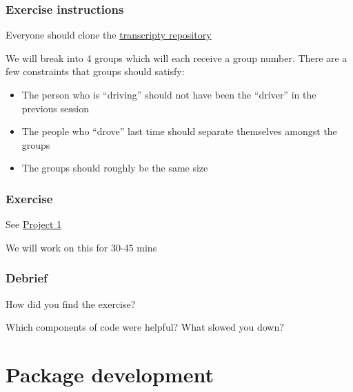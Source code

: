 \documentclass[10pt]{beamer}
\begin{document}
  \begin{frame} \frametitle{Exercise instructions}

    Everyone should clone the
    \href{https://github.com/cc7768/transcripty}{transcripty repository}

    \vspace{0.25cm}

    We will break into 4 groups which will each receive a group number. There are a few
    constraints that groups should satisfy:

    \begin{itemize}
      \item The person who is ``driving'' should not have been the ``driver'' in the
        previous session
      \item The people who ``drove'' last time should separate themselves amongst the
        groups
      \item The groups should roughly be the same size
    \end{itemize}

  \end{frame}

  \begin{frame} \frametitle{Exercise}

    See \href{https://github.com/nyupredocs/modularizationandtesting/blob/master/Projects/Project_1_HendricksLeukhina.md}{Project 1}

    \vspace{0.25cm}

    We will work on this for 30-45 mins

  \end{frame}

  \begin{frame} \frametitle{Debrief}

    How did you find the exercise?

    Which components of code were helpful? What slowed you down?

  \end{frame}



\section{Package development}
\end{document}
